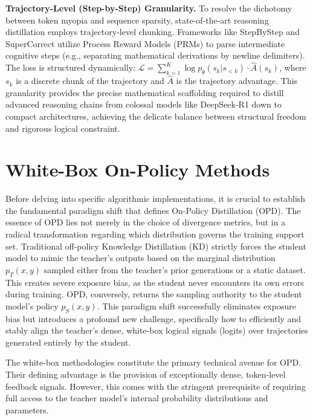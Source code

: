 \documentclass{article} %
\newcommand{\ptheta}{p_\theta}
\newcommand{\loss}{\mathcal{L}}
\begin{document}
\textbf{Trajectory-Level (Step-by-Step) Granularity.} To resolve the dichotomy between token myopia and sequence sparsity, state-of-the-art reasoning distillation employs trajectory-level chunking. Frameworks like StepByStep \citep{2305.02301} and SuperCorrect \citep{2410.09008} utilize Process Reward Models (PRMs) \citep{2305.20050} to parse intermediate cognitive steps (e.g., separating mathematical derivations by newline delimiters). The loss is structured dynamically: $\loss = \sum_{k=1}^K \log \ptheta(s_k | s_{<k}) \cdot \hat{A}(s_k)$, where $s_k$ is a discrete chunk of the trajectory and $\hat{A}$ is the trajectory advantage. This granularity provides the precise mathematical scaffolding required to distill advanced reasoning chains from colossal models like DeepSeek-R1 down to compact architectures, achieving the delicate balance between structural freedom and rigorous logical constraint.


\section{White-Box On-Policy Methods}
\label{sec:white_box}

Before delving into specific algorithmic implementations, it is crucial to establish the fundamental paradigm shift that defines On-Policy Distillation (OPD). The essence of OPD lies not merely in the choice of divergence metrics, but in a radical transformation regarding which distribution governs the training support set. Traditional off-policy Knowledge Distillation (KD) strictly forces the student model to mimic the teacher's outputs based on the marginal distribution $p_T(x, y)$ sampled either from the teacher's prior generations or a static dataset. This creates severe exposure bias, as the student never encounters its own errors during training. OPD, conversely, returns the sampling authority to the student model's policy $p_S(x, y)$. This paradigm shift successfully eliminates exposure bias but introduces a profound new challenge, specifically how to efficiently and stably align the teacher's dense, white-box logical signals (logits) over trajectories generated entirely by the student. 

The white-box methodologies constitute the primary technical avenue for OPD. Their defining advantage is the provision of exceptionally dense, token-level feedback signals. However, this comes with the stringent prerequisite of requiring full access to the teacher model's internal probability distributions and parameters.
\end{document}
